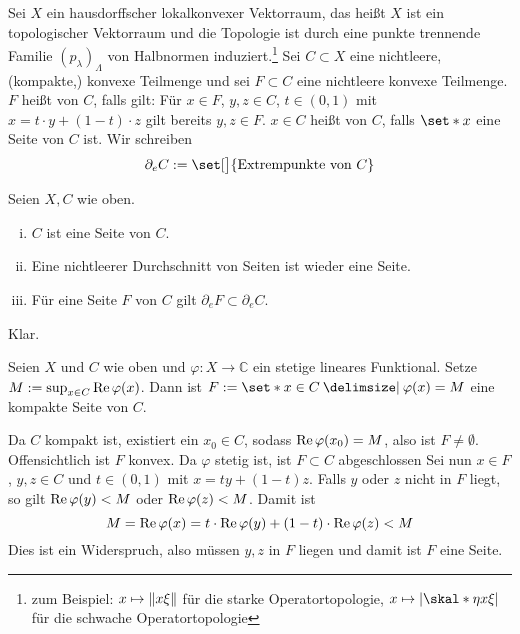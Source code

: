 \begin{definition}[{name=[Seiten und Extrempunkte]}]
	Sei $X$ ein hausdorffscher lokalkonvexer Vektorraum, das heißt $X$ ist ein topologischer Vektorraum und die Topologie ist durch eine punkte trennende Familie $(p_\lambda)_\Lambda$ von Halbnormen induziert.\footnote{zum Beispiel: $x \mapsto \norm*{x \xi}$ für die starke Operatortopologie, $x \mapsto \abs*{\skal*{\eta}{x \xi}} $ für die schwache Operatortopologie}
	Sei $C \subset X$ eine nichtleere, (kompakte,) konvexe Teilmenge und sei $F \subset C$ eine nichtleere konvexe Teilmenge.
	$F$ heißt  von $C$, falls gilt:  
	Für $x \in F$, $y,z \in C$, $t \in (0,1)$ mit $x= t \cdot y +(1-t) \cdot z$ gilt bereits $y,z \in F$.
	$x \in C$ heißt  von $C$, falls $\set*{x}$ eine Seite von $C$ ist.
	Wir schreiben 
	\[
		\partial_e C := \set[\big]{\text{Extrempunkte von } C}
	\]
\end{definition}

\begin{proposition}[{name=[grundlegen Eigenschaften von Seiten]},label=prop:78]
	Seien $X,C$ wie oben.
	\begin{enumerate}[(i)]
		\item $C$ ist eine Seite von $C$.
		\item Eine nichtleerer Durchschnitt von Seiten ist wieder eine Seite.
		\item Für eine Seite $F$ von $C$ gilt $\partial_e F \subset \partial_e C$.
	\end{enumerate}
\end{proposition}
\begin{beweis}
	Klar.
\end{beweis}

\begin{lemma}[label=lem:79]
	Seien $X$ und $C$ wie oben und $\varphi \colon X \to \mathbb{C}$ ein stetige lineares Funktional.
	Setze $M :=\sup_{x \in C} \re \varphi(x)$.
	Dann ist $F:= \set*{x \in C \given \varphi(x)=M}$ eine kompakte Seite von $C$.
\end{lemma}
\begin{beweis}
	Da $C$ kompakt ist, existiert ein $x_0 \in C$, sodass $\re \varphi(x_0)=M$, also ist $F \neq \emptyset$.
	Offensichtlich ist $F$ konvex.
	Da $\varphi$ stetig ist, ist $F \subset C$ abgeschlossen 
	Sei nun $x \in F$, $y,z \in C$ und $t \in (0,1)$ mit $x= t y +(1-t)z$.
	Falls $y$ oder $z$ nicht in $F$ liegt, so gilt $\re \varphi(y) <M$ oder $\re \varphi(z)<M$.
	Damit ist 
	\[
		M = \re \varphi(x) = t \cdot \re \varphi(y) + (1-t) \cdot \re \varphi(z) <M
	\]
	Dies ist ein Widerspruch, also müssen $y,z$ in $F$ liegen und damit ist $F$ eine Seite. 
\end{beweis}

